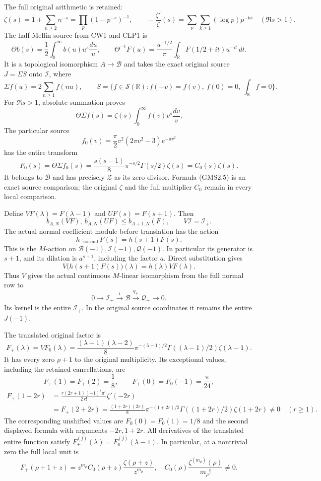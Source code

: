 The full original arithmetic is retained: \[
\zeta(s)=1+\sum_{n\ge2}n^{-s}=\prod_p(1-p^{-s})^{-1},
\qquad
-\frac{\zeta'}{\zeta}(s)=\sum_p\sum_{k\ge1}(\log p)p^{-ks}
\quad(\Re s>1).
\tag{GMS2.1}
\] The half-Mellin source from CW1 and CLP1 is \[
\Theta b(s)=\frac12\int_0^\infty b(u)u^s\frac{du}{u},\qquad
\Theta^{-1}F(u)=\frac{u^{-1/2}}\pi
\int_{\mathbb R}F(1/2+it)u^{-it}\,dt.
\tag{GMS2.2}
\] It is a topological isomorphism \(A\to\mathcal B\) and takes the
exact original source \(J=\Sigma S\) onto \(\mathcal I\), where \[
\Sigma f(u)=2\sum_{n\ge1}f(nu),\qquad
S=\{f\in\mathcal S(\mathbb R):f(-v)=f(v),\ f(0)=0,\ \int_{\mathbb R}f=0\}.
\tag{GMS2.3}
\] For \(\Re s>1\), absolute summation proves \[
\Theta\Sigma f(s)=\zeta(s)\int_0^\infty f(v)v^s\frac{dv}{v}.
\tag{GMS2.4}
\] The particular source \[
f_0(v)=\frac\pi2v^2(2\pi v^2-3)e^{-\pi v^2}
\] has the entire transform \[
F_0(s)=\Theta\Sigma f_0(s)
=\frac{s(s-1)}8\pi^{-s/2}\Gamma(s/2)\zeta(s)
=C_0(s)\zeta(s).
\tag{GMS2.5}
\] It belongs to \(\mathcal B\) and has precisely \(\mathscr Z\) as its
zero divisor. Formula (GMS2.5) is an exact source comparison; the
original \(\zeta\) and the full multiplier \(C_0\) remain in every local
comparison.

Define \(VF(\lambda)=F(\lambda-1)\) and \(UF(s)=F(s+1)\). Then \[
b_{A,N}(VF),\ b_{A,N}(UF)\le b_{A+1,N}(F),\qquad
V\mathcal I=\mathcal I_+.
\tag{GMS2.6}
\] The actual normal coefficient module before translation has the
action \[
h\cdot_{\mathrm{normal}}F(s)=h(s+1)F(s).
\tag{GMS2.7}
\] This is the \(M\)-action on
\(\mathcal B(-1),\mathcal I(-1),\mathcal Q(-1)\). In particular its
generator is \(s+1\), and its dilation is \(a^{s+1}\), including the
factor \(a\). Direct substitution gives \[
V\bigl(h(s+1)F(s)\bigr)(\lambda)=h(\lambda)VF(\lambda).
\tag{GMS2.8}
\] Thus \(V\) gives the actual continuous \(M\)-linear isomorphism from
the full normal row to \[
0\longrightarrow\mathcal I_+\xrightarrow{\iota}\mathcal B
\xrightarrow{q_+}\mathcal Q_+\longrightarrow0.
\tag{GMS2.9}
\] Its kernel is the entire \(\mathcal I_+\). In the original source
coordinates it remains the entire \(J(-1)\).

The translated original factor is \[
F_+(\lambda)=VF_0(\lambda)
=\frac{(\lambda-1)(\lambda-2)}8
\pi^{-(\lambda-1)/2}\Gamma((\lambda-1)/2)\zeta(\lambda-1).
\tag{GMS2.10}
\] It has every zero \(\rho+1\) to the original multiplicity. Its
exceptional values, including the retained cancellations, are \[
F_+(1)=F_+(2)=\frac18,\qquad F_+(0)=F_0(-1)=\frac\pi{24},
\] \[
\begin{aligned}
F_+(1-2r)
&=\frac{r(2r+1)(-1)^r\pi^r}{2\,r!}\zeta'(-2r)\\
&=F_+(2+2r)
=\frac{(1+2r)(2r)}8\pi^{-(1+2r)/2}
\Gamma((1+2r)/2)\zeta(1+2r)\ne0\quad(r\ge1).
\end{aligned}
\tag{GMS2.11}
\] The corresponding unshifted values are \(F_0(0)=F_0(1)=1/8\) and the
second displayed formula with arguments \(-2r,1+2r\). All derivatives of
the translated entire function satisfy
\(F_+^{(j)}(\lambda)=F_0^{(j)}(\lambda-1)\). In particular, at a
nontrivial zero the full local unit is \[
F_+(\rho+1+z)=z^{m_\rho}
C_0(\rho+z)\frac{\zeta(\rho+z)}{z^{m_\rho}},
\quad
C_0(\rho)\frac{\zeta^{(m_\rho)}(\rho)}{m_\rho!}\ne0.
\tag{GMS2.12}
\]

